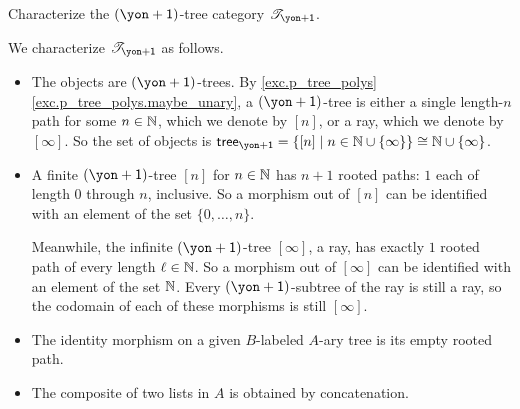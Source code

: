 \documentclass[Book-Poly]{subfiles}
\begin{document}
\begin{exercise}
Characterize the $\left(\yon+\1\right)$-tree category $\cofree{\yon+\1}$.
\begin{solution}
We characterize $\cofree{\yon+\1}$ as follows.
\begin{itemize}
    \item The objects are $(\yon+\1)$-trees.
    By \cref{exc.p_tree_polys} \cref{exc.p_tree_polys.maybe_unary}, a $(\yon+\1)$-tree is either a single length-$n$ path for some $n\in\mathbb{N}$, which we denote by $[n]$, or a ray, which we denote by $[\infty]$.
    So the set of objects is $\tr_{\yon+\1}=\{[n]\mid n\in\nn\cup\{\infty\}\}\iso\nn\cup\{\infty\}$.
    \item A finite $(\yon+\1)$-tree $[n]$ for $n\in\mathbb{N}$ has $n+1$ rooted paths: $1$ each of length $0$ through $n$, inclusive.
    So a morphism out of $[n]$ can be identified with an element of the set $\{0,\ldots,n\}$.

    Meanwhile, the infinite $(\yon+\1)$-tree $[\infty]$, a ray, has exactly $1$ rooted path of every length $\ell\in\mathbb{N}$.
    So a morphism out of $[\infty]$ can be identified with an element of the set $\mathbb{N}$.
    Every $(\yon+\1)$-subtree of the ray is still a ray, so the codomain of each of these morphisms is still $[\infty]$.
    \item The identity morphism on a given $B$-labeled $A$-ary tree is its empty rooted path.
    \item The composite of two lists in $A$ is obtained by concatenation.
\end{itemize}
\end{solution}
\end{exercise}
\end{document}
